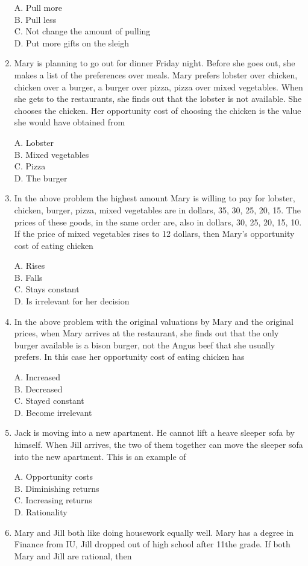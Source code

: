 \documentclass[
]{book}
\begin{document}
\begin{enumerate}
  A. Pull more\\
  B. Pull less\\
  C. Not change the amount of pulling\\
  D. Put more gifts on the sleigh
\item
  Mary is planning to go out for dinner Friday night. Before she goes out, she makes a list of the preferences over meals. Mary prefers lobster over chicken, chicken over a burger, a burger over pizza, pizza over mixed vegetables. When she gets to the restaurants, she finds out that the lobster is not available. She chooses the chicken. Her opportunity cost of choosing the chicken is the value she would have obtained from

  A. Lobster\\
  B. Mixed vegetables\\
  C. Pizza\\
  D. The burger
\item
  In the above problem the highest amount Mary is willing to pay for lobster, chicken, burger, pizza, mixed vegetables are in dollars, 35, 30, 25, 20, 15. The prices of these goods, in the same order are, also in dollars, 30, 25, 20, 15, 10. If the price of mixed vegetables rises to 12 dollars, then Mary's opportunity cost of eating chicken

  A. Rises\\
  B. Falls\\
  C. Stays constant\\
  D. Is irrelevant for her decision
\item
  In the above problem with the original valuations by Mary and the original prices, when Mary arrives at the restaurant, she finds out that the only burger available is a bison burger, not the Angus beef that she usually prefers. In this case her opportunity cost of eating chicken has

  A. Increased\\
  B. Decreased\\
  C. Stayed constant\\
  D. Become irrelevant
\item
  Jack is moving into a new apartment. He cannot lift a heave sleeper sofa by himself. When Jill arrives, the two of them together can move the sleeper sofa into the new apartment. This is an example of

  A. Opportunity costs\\
  B. Diminishing returns\\
  C. Increasing returns\\
  D. Rationality
\item
  Mary and Jill both like doing housework equally well. Mary has a degree in Finance from IU, Jill dropped out of high school after 11the grade. If both Mary and Jill are rational, then


\end{enumerate}
\end{document}
